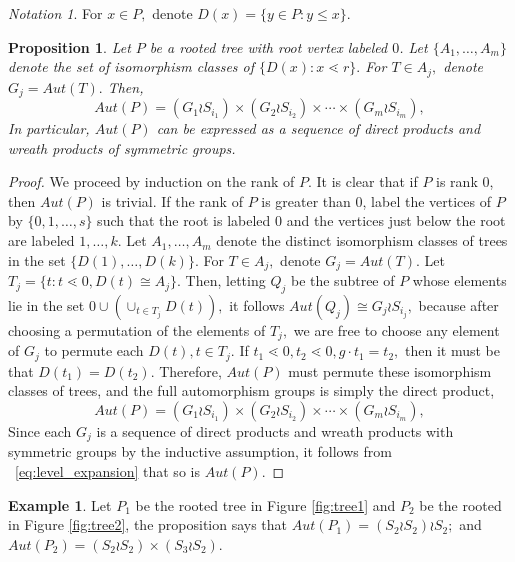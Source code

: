 \documentclass[10 pt]{amsart}
\theoremstyle{plain}
\newtheorem{prop}[thm]{Proposition}
\theoremstyle{definition}
\newtheorem{eg}[thm]{Example}
\theoremstyle{remark}
\newtheorem{note}[thm]{Notation}
\numberwithin{equation}{section}
\begin{document}
\begin{note}
For $x \in P,$ denote $D(x) = \{y \in P: y \leq x\}.$
\end{note}
\begin{prop}
\label{prop:automorphism_trees}
Let $P$ be a rooted tree with root vertex labeled $0$. Let $\{A_1,\ldots,A_m\}$ denote the set of isomorphism classes of $\{D(x):x\lessdot r\}.$ For $T \in A_j,$ denote $G_j = Aut(T).$ Then, 
\begin{equation}
\label{eq:level_expansion}
Aut(P) = (G_1 \wr S_{i_1}) \times (G_2 \wr S_{i_2}) \times \cdots \times (G_m\wr S_{i_m}),
\end{equation}
In particular, $Aut(P)$ can be expressed as a sequence of direct products and wreath products of symmetric groups.
\end{prop}

\begin{proof}
We proceed by induction on the rank of $P$.  It is clear that if $P$ is rank 0, then $Aut(P)$ is trivial.  If the rank of $P$ is greater than 0, label the vertices of $P$ by $\{0,1,\ldots, s\}$ such that the root is labeled $0$ and the vertices just below the root are labeled $1, \ldots, k.$ Let $A_1,\ldots, A_m$ denote the distinct isomorphism classes of trees in the set $\{D(1),\ldots, D(k)\}.$ For $T \in A_j,$ denote $G_j = Aut(T).$ 
Let $T_j = \{t:t\lessdot 0,D(t) \cong A_j\}.$ Then, letting $Q_j$ be the subtree of $P$ whose elements lie in the set $0 \cup (\cup_{t \in T_j} D(t)),$ it follows $Aut(Q_j) \cong G_j \wr S_{i_j},$ because after choosing a permutation of the elements of $T_j,$ we are free to choose any element of $G_j$ to permute each $D(t),t \in T_j$. If $t_1 \lessdot 0,t_2 \lessdot 0,g \cdot t_1 = t_2,$ then it must be that $D(t_1) = D(t_2).$ Therefore, $Aut(P)$ must permute these isomorphism classes of trees, and the full automorphism groups is simply the direct product, 
\begin{equation}
\label{eq:level_expansion}
Aut(P) = (G_1 \wr S_{i_1}) \times (G_2 \wr S_{i_2}) \times \cdots \times (G_m\wr S_{i_m}),
\end{equation}
Since each $G_j$ is a sequence of direct products and wreath products with symmetric groups by the inductive assumption, it follows from ~\eqref{eq:level_expansion} that so is $Aut(P).$
\end{proof}

\begin{eg}
Let $P_1$ be the rooted tree  in Figure \ref{fig:tree1} and $P_2$ be the rooted in Figure \ref{fig:tree2}, the proposition says that $Aut (P_1) = (S_2 \wr S_2)\wr S_2;$ and $Aut(P_2) = (S_2 \wr S_2) \times (S_3 \wr S_2) $. 
\end{eg}
\end{document}
